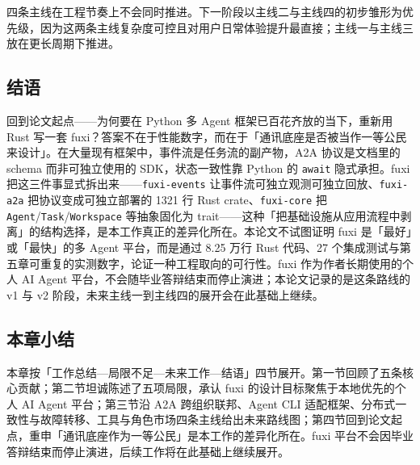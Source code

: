 四条主线在工程节奏上不会同时推进。下一阶段以主线二与主线四的初步雏形为优先级，因为这两条主线复杂度可控且对用户日常体验提升最直接；主线一与主线三放在更长周期下推进。

\subsection{结语}
\label{subsec:closing}

回到论文起点——为何要在 Python 多 Agent 框架已百花齐放的当下，重新用 Rust 写一套 fuxi？答案不在于性能数字，而在于「通讯底座是否被当作一等公民来设计」。在大量现有框架中，事件流是任务流的副产物，A2A 协议是文档里的 schema 而非可独立使用的 SDK，状态一致性靠 Python 的 \texttt{await} 隐式承担。fuxi 把这三件事显式拆出来——\texttt{fuxi-events} 让事件流可独立观测可独立回放、\texttt{fuxi-a2a} 把协议变成可独立部署的 1321 行 Rust crate、\texttt{fuxi-core} 把 \texttt{Agent}/\texttt{Task}/\texttt{Workspace} 等抽象固化为 trait——这种「把基础设施从应用流程中剥离」的结构选择，是本工作真正的差异化所在。本论文不试图证明 fuxi 是「最好」或「最快」的多 Agent 平台，而是通过 8.25 万行 Rust 代码、27 个集成测试与第五章可重复的实测数字，论证一种工程取向的可行性。fuxi 作为作者长期使用的个人 AI Agent 平台，不会随毕业答辩结束而停止演进；本论文记录的是这条路线的 v1 与 v2 阶段，未来主线一到主线四的展开会在此基础上继续。

\subsection{本章小结}

本章按「工作总结—局限不足—未来工作—结语」四节展开。第一节回顾了五条核心贡献；第二节坦诚陈述了五项局限，承认 fuxi 的设计目标聚焦于本地优先的个人 AI Agent 平台；第三节沿 A2A 跨组织联邦、Agent CLI 适配框架、分布式一致性与故障转移、工具与角色市场四条主线给出未来路线图；第四节回到论文起点，重申「通讯底座作为一等公民」是本工作的差异化所在。fuxi 平台不会因毕业答辩结束而停止演进，后续工作将在此基础上继续展开。

